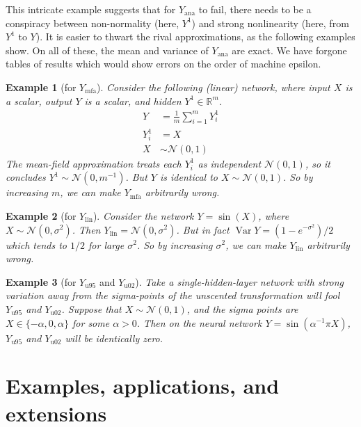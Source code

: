 \documentclass{article}
\newtheorem{example}{Example}
\DeclareMathOperator{\Var}{\operatorname{Var}}
\begin{document}
This intricate example suggests that for \(Y_\mathrm{ana}\) to fail, there needs to be a conspiracy between non-normality (here, \(Y^1\)) and strong nonlinearity (here, from \(Y^1\) to \(Y\)).
It is easier to thwart the rival approximations, as the following examples show.
On all of these, the mean and variance of \(Y_\mathrm{ana}\) are exact.
We have forgone tables of results which would show errors on the order of machine epsilon.

\begin{example}[for \(Y_\mathrm{mfa}\)]
  \label{ex:mean-field}
  Consider the   following (linear) network, where input \(X\) is a scalar, output \(Y\) is a scalar, and hidden \(Y^1\in \mathbb{R}^m\).
  \begin{align*}
    Y &= \frac{1}{m} \sum_{i=1}^m Y^1_i
    \\
    Y^1_i &= X
    \\
    X &\sim \mathcal N(0, 1)
  \end{align*}
  The mean-field approximation treats each \(Y_i^1\) as independent \(\mathcal N(0, 1)\), so it concludes \(Y^1\sim \mathcal N(0, m^{-1})\).
  But \(Y\) is identical to \(X\sim \mathcal N(0, 1)\).
  So by increasing \(m\), we can make \(Y_\mathrm{mfa}\) arbitrarily wrong.
\end{example}

\begin{example}[for \(Y_\mathrm{lin}\)]
  Consider the network \(Y = \sin(X)\), where \(X \sim \mathcal N ({0, \sigma^2})\).
  Then \(Y_\mathrm{lin} = \mathcal{N}(0, \sigma^2)\).
  But in fact \(\Var Y = (1 - e^{-\sigma^2})/2\) which tends to \(1/2\) for large \(\sigma^2\).
  So by increasing \(\sigma^2\), we can make \(Y_\mathrm{lin}\) arbitrarily wrong.
\end{example}



\begin{example}[for \(Y_\mathrm{u95}\) and \(Y_\mathrm{u02}\)]
  Take a single-hidden-layer network with strong variation away from the sigma-points of the unscented transformation will fool \(Y_\mathrm{u95}\) and \(Y_\mathrm{u02}\).
  Suppose that \(X \sim \mathcal N(0, 1)\), and the sigma points are \(X \in \{-\alpha, 0, \alpha\}\) for some \(\alpha > 0\).
  Then on the neural network \(Y = \sin(\alpha^{-1}\pi X)\), \(Y_\mathrm{u95}\) and \(Y_\mathrm{u02}\) will be identically zero.
\end{example}


\section{Examples, applications, and extensions}
\end{document}
